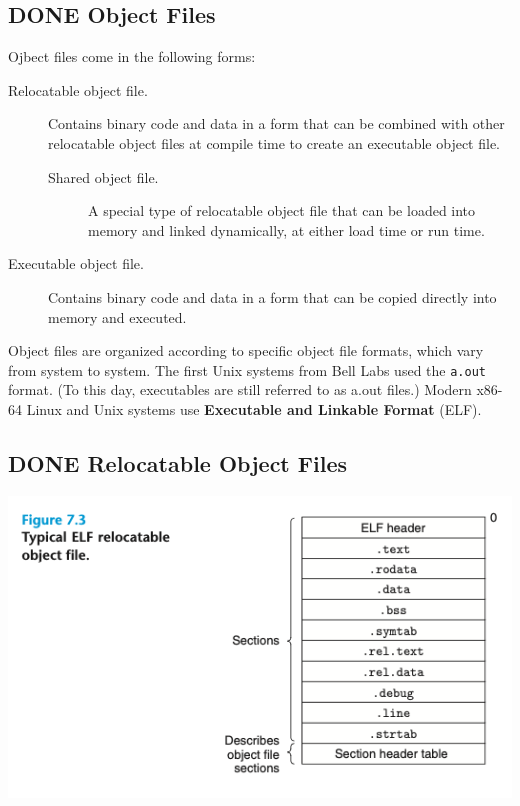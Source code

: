 \documentclass[11pt]{article}
\begin{document}
\subsection{{\bfseries\sffamily DONE} Object Files}
\label{sec:org9beeb00}
Ojbect files come in the following forms:\\
\begin{description}
\item[{Relocatable object file.}] Contains binary code and data in a form that can be combined with other relocatable object files at compile time to create an executable object file.\\
\begin{description}
\item[{Shared object file.}] A special type of relocatable object file that can be loaded into memory and linked dynamically, at either load time or run time.\\
\end{description}
\item[{Executable object file.}] Contains binary code and data in a form that can be copied directly into memory and executed.\\
\end{description}



Object files are organized according to specific object file formats, which vary from system to system. The first Unix systems from Bell Labs used the \texttt{a.out} format. (To this day, executables are still referred to as a.out files.)  Modern x86-64 Linux and Unix systems use \textbf{Executable and Linkable Format} (ELF).\\


\subsection{{\bfseries\sffamily DONE} Relocatable Object Files}
\label{sec:org4552788}

\begin{center}
\includegraphics[width=.9\linewidth]{pics/figure7.3-typical-elf-relocatable-object-file.png}
\end{center}
\end{document}
